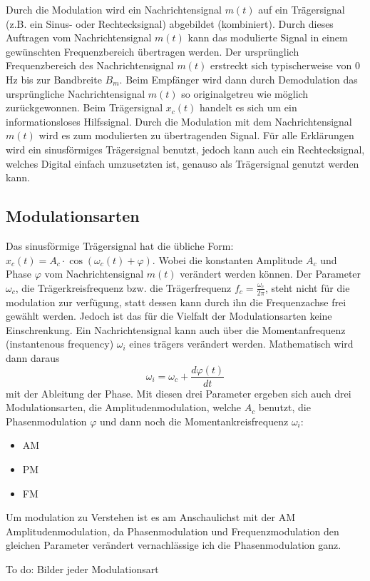 %
%
%

Durch die Modulation wird ein Nachrichtensignal \(m(t)\) auf ein Trägersignal (z.B. ein Sinus- oder Rechtecksignal) abgebildet (kombiniert).
Durch dieses Auftragen vom Nachrichtensignal \(m(t)\) kann das modulierte Signal in einem gewünschten Frequenzbereich übertragen werden.
Der ursprünglich Frequenzbereich des Nachrichtensignal \(m(t)\) erstreckt sich typischerweise von 0 Hz bis zur Bandbreite \(B_m\).
Beim Empfänger wird dann durch Demodulation das ursprüngliche Nachrichtensignal \(m(t)\) so originalgetreu wie möglich zurückgewonnen.
Beim Trägersignal \(x_c(t)\) handelt es sich um ein informationsloses Hilfssignal.
Durch die Modulation mit dem Nachrichtensignal \(m(t)\) wird es zum modulierten zu übertragenden Signal.
Für alle Erklärungen wird ein sinusförmiges Trägersignal benutzt, jedoch kann auch ein Rechtecksignal,
welches Digital einfach umzusetzten ist, 
genauso als Trägersignal genutzt werden kann.\cite{fm:NAT}

\subsection{Modulationsarten\label{fm:section:modulation}}

Das sinusförmige Trägersignal hat die übliche Form: 
\(x_c(t) = A_c \cdot \cos(\omega_c(t)+\varphi)\).
Wobei die konstanten Amplitude \(A_c\) und Phase \(\varphi\) vom Nachrichtensignal \(m(t)\) verändert werden können.
Der Parameter \(\omega_c\), die Trägerkreisfrequenz bzw. die Trägerfrequenz \(f_c = \frac{\omega_c}{2\pi}\),
steht nicht für die modulation zur verfügung, statt dessen kann durch ihn die Frequenzachse frei gewählt werden.
\newblockpunct
Jedoch ist das für die Vielfalt der Modulationsarten keine Einschrenkung.
Ein Nachrichtensignal kann auch über die Momentanfrequenz (instantenous frequency) \(\omega_i\) eines trägers verändert werden.
Mathematisch wird dann daraus
\[
    \omega_i = \omega_c + \frac{d \varphi(t)}{dt}
\]
mit der Ableitung der Phase\cite{fm:NAT}.
Mit diesen drei Parameter ergeben sich auch drei Modulationsarten, die Amplitudenmodulation, welche \(A_c\) benutzt, 
die Phasenmodulation \(\varphi\) und dann noch die Momentankreisfrequenz \(\omega_i\): 
\begin{itemize}
    \item AM
    \item PM
    \item FM
\end{itemize}
Um modulation zu Verstehen ist es am Anschaulichst mit der AM Amplitudenmodulation, 
da Phasenmodulation und Frequenzmodulation den gleichen Parameter verändert vernachlässige ich die Phasenmodulation ganz.

To do: Bilder jeder Modulationsart




